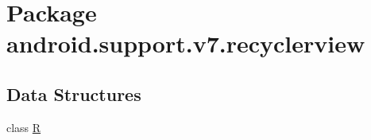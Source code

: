 \hypertarget{namespaceandroid_1_1support_1_1v7_1_1recyclerview}{}\section{Package android.\+support.\+v7.\+recyclerview}
\label{namespaceandroid_1_1support_1_1v7_1_1recyclerview}
\subsection*{Data Structures}
\begin{DoxyCompactItemize}
\item 
class \mbox{\hyperlink{classandroid_1_1support_1_1v7_1_1recyclerview_1_1_r}{R}}
\end{DoxyCompactItemize}

